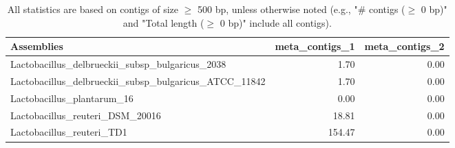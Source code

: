 \documentclass[12pt,a4paper]{article}
\begin{document}
\begin{table}[ht]
\begin{center}
\caption{All statistics are based on contigs of size $\geq$ 500 bp, unless otherwise noted (e.g., "\# contigs ($\geq$ 0 bp)" and "Total length ($\geq$ 0 bp)" include all contigs).}
\begin{tabular}{|l*{2}{|r}|}
\hline
Assemblies & meta\_contigs\_1 & meta\_contigs\_2 \\ \hline
Lactobacillus\_delbrueckii\_subsp\_bulgaricus\_2038 & 1.70 & 0.00 \\ \hline
Lactobacillus\_delbrueckii\_subsp\_bulgaricus\_ATCC\_11842 & 1.70 & 0.00 \\ \hline
Lactobacillus\_plantarum\_16 & 0.00 & 0.00 \\ \hline
Lactobacillus\_reuteri\_DSM\_20016 & 18.81 & 0.00 \\ \hline
Lactobacillus\_reuteri\_TD1 & 154.47 & 0.00 \\ \hline
\end{tabular}
\end{center}
\end{table}
\end{document}
